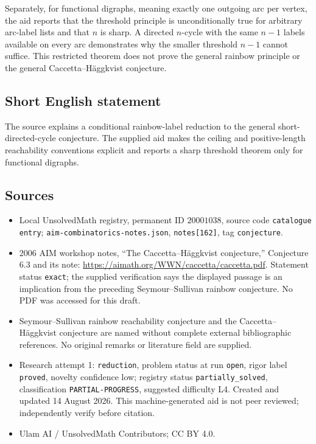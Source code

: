 \documentclass[11pt]{article}
\begin{document}
Separately, for functional digraphs, meaning exactly one outgoing arc per vertex, the aid reports that the threshold principle is unconditionally true for arbitrary arc-label lists and that \(n\) is sharp. A directed \(n\)-cycle with the same \(n-1\) labels available on every arc demonstrates why the smaller threshold \(n-1\) cannot suffice. This restricted theorem does not prove the general rainbow principle or the general Caccetta--H\"aggkvist conjecture.
\subsection{Short English statement}
The source explains a conditional rainbow-label reduction to the general short-directed-cycle conjecture. The supplied aid makes the ceiling and positive-length reachability conventions explicit and reports a sharp threshold theorem only for functional digraphs.
\subsection{Sources}
\begin{itemize}
\item Local UnsolvedMath registry, permanent ID \(20001038\), source code \texttt{catalogue entry}; \texttt{aim-combinatorics-notes.json}, \texttt{notes[162]}, tag \texttt{conjecture}.
\item 2006 AIM workshop notes, ``The Caccetta--H\"aggkvist conjecture,'' Conjecture 6.3 and its note: \url{https://aimath.org/WWN/caccetta/caccetta.pdf}. Statement status \texttt{exact}; the supplied verification says the displayed passage is an implication from the preceding Seymour--Sullivan rainbow conjecture. No PDF was accessed for this draft.
\item Seymour--Sullivan rainbow reachability conjecture and the Caccetta--H\"aggkvist conjecture are named without complete external bibliographic references. No original remarks or literature field are supplied.
\item Research attempt 1: \texttt{reduction}, problem status at run \texttt{open}, rigor label \texttt{proved}, novelty confidence low; registry status \texttt{partially\_solved}, classification \texttt{PARTIAL-PROGRESS}, suggested difficulty L4. Created and updated 14 August 2026. This machine-generated aid is not peer reviewed; independently verify before citation.
\item Ulam AI / UnsolvedMath Contributors; CC BY 4.0.
\end{itemize}
\end{document}
